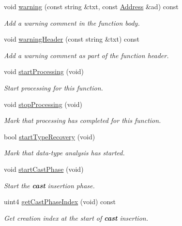 \begin{DoxyCompactItemize}
void \mbox{\hyperlink{class_funcdata_a19698f34a432f84d8cbe94f8e0ad20d4}{warning}} (const string \&txt, const \mbox{\hyperlink{class_address}{Address}} \&ad) const
\begin{DoxyCompactList}\small\item\em Add a warning comment in the function body. \end{DoxyCompactList}\item 
void \mbox{\hyperlink{class_funcdata_a87967b12187406a7fdf311cc4b836118}{warning\+Header}} (const string \&txt) const
\begin{DoxyCompactList}\small\item\em Add a warning comment as part of the function header. \end{DoxyCompactList}\item 
void \mbox{\hyperlink{class_funcdata_a0637a2c7f6a1e511284cfeecb4b0d475}{start\+Processing}} (void)
\begin{DoxyCompactList}\small\item\em Start processing for this function. \end{DoxyCompactList}\item 
void \mbox{\hyperlink{class_funcdata_a36b7bf9f9ad6a3c56968f4daa9ca27d5}{stop\+Processing}} (void)
\begin{DoxyCompactList}\small\item\em Mark that processing has completed for this function. \end{DoxyCompactList}\item 
bool \mbox{\hyperlink{class_funcdata_a0add0ec99a303d6cdfc5187bb2c768f7}{start\+Type\+Recovery}} (void)
\begin{DoxyCompactList}\small\item\em Mark that data-\/type analysis has started. \end{DoxyCompactList}\item 
void \mbox{\hyperlink{class_funcdata_a5f04b2e649dafbd6384d6a5ad7417290}{start\+Cast\+Phase}} (void)
\begin{DoxyCompactList}\small\item\em Start the {\bfseries{cast}} insertion phase. \end{DoxyCompactList}\item 
uint4 \mbox{\hyperlink{class_funcdata_a4a6eb70553bc51e0ed7d2acde1b080ad}{get\+Cast\+Phase\+Index}} (void) const
\begin{DoxyCompactList}\small\item\em Get creation index at the start of {\bfseries{cast}} insertion. \end{DoxyCompactList}\item 

\end{DoxyCompactItemize}
